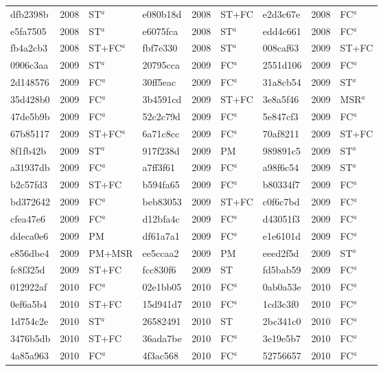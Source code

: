 \begin{longtable}{lll@{\hspace{10pt}}lll@{\hspace{10pt}}lll}
dfb2398b & 2008 & ST$^{a}$ & e080b18d & 2008 & ST+FC & e2d3c67e & 2008 & FC$^{a}$ \\
e5fa7505 & 2008 & ST$^{a}$ & e6075fca & 2008 & ST$^{a}$ & edd4c661 & 2008 & FC$^{a}$ \\
fb4a2cb3 & 2008 & ST+FC$^{a}$ & fbf7e330 & 2008 & ST$^{a}$ & 008caf63 & 2009 & ST+FC \\
0906c3aa & 2009 & ST$^{a}$ & 20795cca & 2009 & FC$^{a}$ & 2551d106 & 2009 & FC$^{a}$ \\
2d148576 & 2009 & FC$^{a}$ & 30ff5eac & 2009 & FC$^{a}$ & 31a8cb54 & 2009 & ST$^{a}$ \\
35d428b0 & 2009 & FC$^{a}$ & 3b4591cd & 2009 & ST+FC & 3e8a5f46 & 2009 & MSR$^{a}$ \\
47de5b9b & 2009 & FC$^{a}$ & 52c2c79d & 2009 & FC$^{a}$ & 5e847cf3 & 2009 & FC$^{a}$ \\
67b85117 & 2009 & ST+FC$^{a}$ & 6a71c8cc & 2009 & FC$^{a}$ & 70af8211 & 2009 & ST+FC \\
8f1fb42b & 2009 & ST$^{a}$ & 917f238d & 2009 & PM & 989891c5 & 2009 & ST$^{a}$ \\
a31937db & 2009 & FC$^{a}$ & a7ff3f61 & 2009 & FC$^{a}$ & a98f6c54 & 2009 & ST$^{a}$ \\
b2c57fd3 & 2009 & ST+FC & b594fa65 & 2009 & FC$^{a}$ & b80334f7 & 2009 & FC$^{a}$ \\
bd372642 & 2009 & FC$^{a}$ & beb83053 & 2009 & ST+FC & c0f6c7bd & 2009 & FC$^{a}$ \\
cfea47e6 & 2009 & FC$^{a}$ & d12bfa4c & 2009 & FC$^{a}$ & d43051f3 & 2009 & FC$^{a}$ \\
ddeca0e6 & 2009 & PM & df61a7a1 & 2009 & FC$^{a}$ & e1e6101d & 2009 & FC$^{a}$ \\
e856dbe4 & 2009 & PM+MSR & ee5ccaa2 & 2009 & PM & eeed2f5d & 2009 & ST$^{a}$ \\
fc8f325d & 2009 & ST+FC & fcc830f6 & 2009 & ST & fd5bab59 & 2009 & FC$^{a}$ \\
012922af & 2010 & FC$^{a}$ & 02e1bb05 & 2010 & FC$^{a}$ & 0ab0a53e & 2010 & FC$^{a}$ \\
0ef6a5b4 & 2010 & ST+FC & 15d941d7 & 2010 & FC$^{a}$ & 1cd3c3f0 & 2010 & FC$^{a}$ \\
1d754c2e & 2010 & ST$^{a}$ & 26582491 & 2010 & ST & 2bc341c0 & 2010 & FC$^{a}$ \\
3476b5db & 2010 & ST+FC & 36ada7be & 2010 & FC$^{a}$ & 3e19e5b7 & 2010 & FC$^{a}$ \\
4a85a963 & 2010 & FC$^{a}$ & 4f3ac568 & 2010 & FC$^{a}$ & 52756657 & 2010 & FC$^{a}$ \\

\end{longtable}
